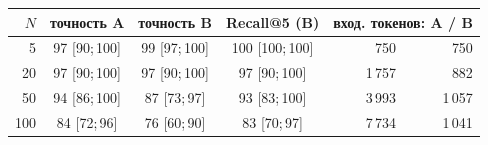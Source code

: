 \begin{tabular}{rcccrr}\toprule
$N$ & точность A & точность B & Recall@5 (B) & \multicolumn{2}{c}{вход. токенов: A / B} \\ \midrule
5 & 97 [90;\,100] & 99 [97;\,100] & 100 [100;\,100] & 750 & 750 \\
20 & 97 [90;\,100] & 97 [90;\,100] & 97 [90;\,100] & 1\,757 & 882 \\
50 & 94 [86;\,100] & 87 [73;\,97] & 93 [83;\,100] & 3\,993 & 1\,057 \\
100 & 84 [72;\,96] & 76 [60;\,90] & 83 [70;\,97] & 7\,734 & 1\,041 \\
\bottomrule\end{tabular}